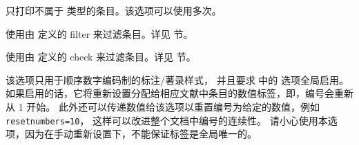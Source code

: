 \begin{optionlist*}

只打印不属于  类型的条目。该选项可以使用多次。



使用由  定义的 filter  来过滤条目。详见  节。



使用由  定义的 check  来过滤条目。详见   节。



该选项只用于顺序数字编码制的标注/著录样式，
并且要求  中的  选项全局启用。
如果启用的话，它将重新设置分配给相应文献中条目的数值标签，即，编号会重新从 1 开始。
此外还可以传递数值给该选项以重置编号为给定的数值，例如 \texttt{resetnumbers=10}，
这样可以改进整个文档中编号的连续性。
请小心使用本选项，因为在手动重新设置下，\biblatex 不能保证标签是全局唯一的。




\end{optionlist*}
